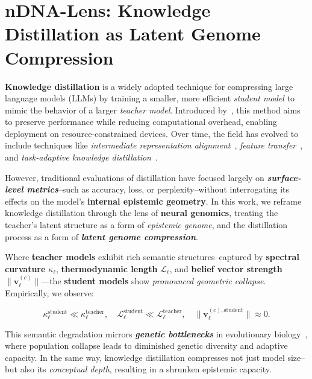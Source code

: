 


\section{nDNA-Lens: Knowledge Distillation as Latent Genome Compression}

\vspace{0.5em}
\noindent \textbf{Knowledge distillation} is a widely adopted technique for compressing large language models (LLMs) by training a smaller, more efficient \emph{student model} to mimic the behavior of a larger \emph{teacher model}. Introduced by~\citep{hinton2015distilling}, this method aims to preserve performance while reducing computational overhead, enabling deployment on resource-constrained devices. Over time, the field has evolved to include techniques like \emph{intermediate representation alignment}~\citep{romero2015fitnets}, \emph{feature transfer}~\citep{gou2021knowledge}, and \emph{task-adaptive knowledge distillation}~\citep{wang2023culturalbias}.

\vspace{0.5em}
\noindent However, traditional evaluations of distillation have focused largely on \textbf{\emph{surface-level metrics}}--such as accuracy, loss, or perplexity--without interrogating its effects on the model’s \textbf{internal epistemic geometry}. In this work, we reframe knowledge distillation through the lens of \textbf{neural genomics}, treating the teacher’s latent structure as a form of \emph{epistemic genome}, and the distillation process as a form of \textbf{\emph{latent genome compression}}.

\vspace{0.5em}
\noindent Where \textbf{teacher models} exhibit rich semantic structures--captured by \textbf{spectral curvature} $\kappa_\ell$, \textbf{thermodynamic length} $\mathcal{L}_\ell$, and \textbf{belief vector strength} $\| \mathbf{v}_\ell^{(c)} \|$—the \textbf{student models} show \emph{pronounced geometric collapse}. Empirically, we observe:

\[
\kappa_\ell^{\text{student}} \ll \kappa_\ell^{\text{teacher}}, \quad 
\mathcal{L}_\ell^{\text{student}} \ll \mathcal{L}_\ell^{\text{teacher}}, \quad 
\| \mathbf{v}_\ell^{(c), \text{student}} \| \approx 0.
\]

\vspace{0.5em}
\noindent This semantic degradation mirrors \textbf{\emph{genetic bottlenecks}} in evolutionary biology~\citep{luikart1998detecting, frankham1995conservation}, where population collapse leads to diminished genetic diversity and adaptive capacity. In the same way, knowledge distillation compresses not just model size--but also its \emph{conceptual depth}, resulting in a shrunken epistemic capacity.

